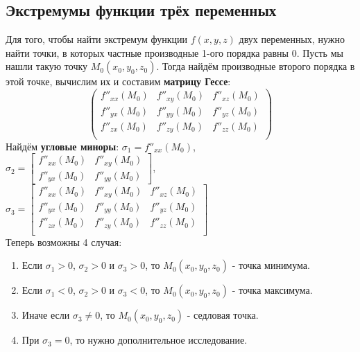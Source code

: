 \subsection{Экстремумы функции трёх переменных}
Для того, чтобы найти экстремум функции $f(x,y,z)$ двух переменных, нужно найти точки, в которых частные производные 1-ого порядка равны $0$. Пусть мы нашли такую точку $M_0(x_0,y_0,z_0)$. Тогда найдём производные второго порядка в этой точке, вычислим их и составим \textbf{матрицу Гессе}:
$$
\begin{pmatrix}
f''_{xx}(M_0) & f''_{xy}(M_0) & f''_{xz}(M_0)\\
f''_{yx}(M_0) & f''_{yy}(M_0) & f''_{yz}(M_0)\\
f''_{zx}(M_0) & f''_{zy}(M_0) & f''_{zz}(M_0)\\
\end{pmatrix}
$$
Найдём \textbf{угловые миноры}:
$\sigma_1 = f''_{xx}(M_0)$,\\
$\sigma_2 = 
\begin{bmatrix}
f''_{xx}(M_0) & f''_{xy}(M_0)\\
f''_{yx}(M_0) & f''_{yy}(M_0)
\end{bmatrix}$,\\
$
\sigma_3 = 
\begin{bmatrix}
f''_{xx}(M_0) & f''_{xy}(M_0) & f''_{xz}(M_0)\\
f''_{yx}(M_0) & f''_{yy}(M_0) & f''_{yz}(M_0)\\
f''_{zx}(M_0) & f''_{zy}(M_0) & f''_{zz}(M_0)\\
\end{bmatrix}$\\
Теперь возможны 4 случая:
\begin{enumerate}
	\item Если $\sigma_1 > 0$, $\sigma_2 > 0$ и $\sigma_3 > 0$, то $M_0(x_0,y_0,z_0)$ - точка минимума.	
	\item Если $\sigma_1 < 0$, $\sigma_2 > 0$ и $\sigma_3 < 0$, то $M_0(x_0,y_0,z_0)$ - точка максимума.	
	\item Иначе если $\sigma_3 \neq 0$, то $M_0(x_0,y_0,z_0)$ - седловая точка.	
	\item При $\sigma_3 = 0$, то нужно дополнительное исследование.	
\end{enumerate}
